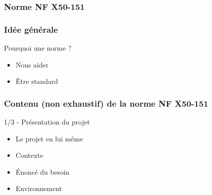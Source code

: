 \subsubsection{Norme NF X50-151}


\begin{frame}
\frametitle{Idée générale}

\begin{block}{Pourquoi une norme ?}
\begin{itemize}
    \item Nous aider %
    \item Être \og{}standard\fg{} %
\end{itemize}
\end{block}
\end{frame}

\begin{frame}
\frametitle{Contenu (non exhaustif) de la norme NF X50-151}
\begin{block}{1/3 - Présentation du projet}
\begin{itemize}
    \item Le projet en lui même %
    \item Contexte %
    \item Énoncé du besoin %
    \item Environnement %
\end{itemize}
\end{block}
\end{frame}

